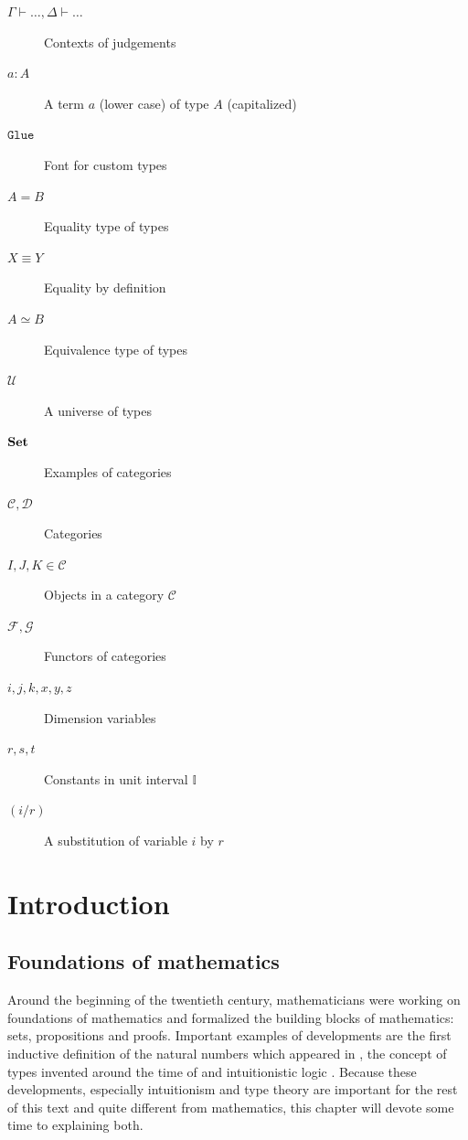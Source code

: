 \documentclass[12pt,a4paper,twoside,xetex]{book} %
\newcommand{\op}[1]{\mathtt{#1}}
\begin{document}
\begin{description}
\item[$\Gamma \vdash \ldots, \Delta \vdash \ldots$] Contexts of judgements
\item[$a : A$] A term $a$ (lower case) of type $A$ (capitalized)
\item[$\op{Glue}$] Font for custom types
\item[$A = B$] Equality type of types
\item[$X \equiv Y$] Equality by definition
\item[$A \simeq B$] Equivalence type of types
\item[$\mathcal{U}$] A universe of types
\item[$\text{\textbf{Set}}$] Examples of categories
\item[$\mathcal{C}, \mathcal{D}$] Categories
\item[$I,J,K \in \mathcal{C}$] Objects in a category $\mathcal{C}$
\item[$\mathcal{F}, \mathcal{G}$] Functors of categories
\item[$i,j,k,x,y,z$] Dimension variables
\item[$r,s,t$] Constants in unit interval $\mathbb{I}$
\item[$(i/r)$] A substitution of variable $i$ by $r$
\end{description}

% 

\tableofcontents


\newpage
\setcounter{page}{0}




\chapter{Introduction}

\section{Foundations of mathematics}\label{types}

Around the beginning of the twentieth century, mathematicians were working on foundations of mathematics and formalized the building blocks of mathematics: sets, propositions and proofs. Important examples of developments are the first inductive definition of the natural numbers which appeared in \cite{Peano1879}, the concept of types invented around the time of \cite{Russel1903} and intuitionistic logic \cite{Heyting1930}. Because these developments, especially intuitionism and type theory are important for the rest of this text and quite different from mathematics, this chapter will devote some time to explaining both.
\end{document}
